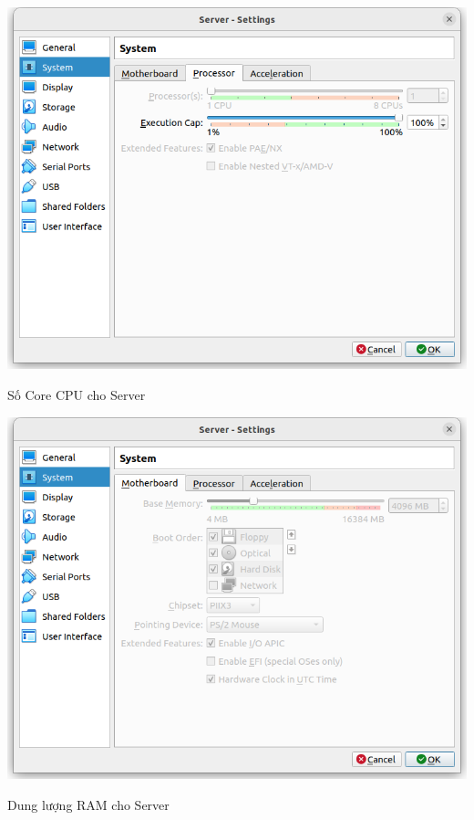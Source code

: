 \documentclass[a4paper, 11pt]{article}
\begin{document}
\begin{itemize}
\begin{enumerate}
                    \begin{minipage}
                        {\linewidth}
                        \captionsetup{type=figure}
                        \centering
                        \includegraphics[width=\linewidth]{images/server-processor.png}
                        \caption{Số Core CPU cho Server}
                        \label{figure:server-processor}
                    \end{minipage}

                    \begin{minipage}{\linewidth}
                        \captionsetup{type=figure}
                        \centering
                        \includegraphics[width=\linewidth]{images/server-ram.png}
                        \caption{Dung lượng RAM cho Server}
                        \label{figure:server-ram}
                    \end{minipage}


\end{enumerate}
\end{itemize}
\end{document}
